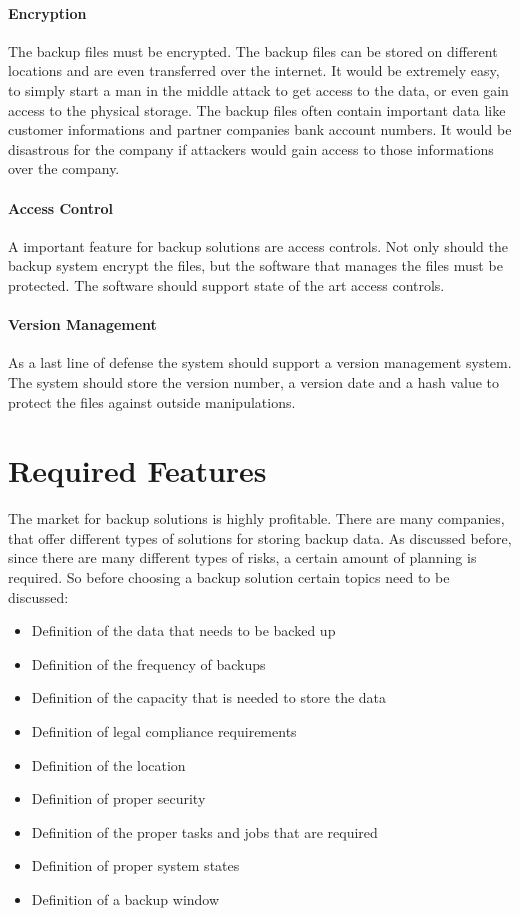 \paragraph{Encryption}

The backup files must be encrypted. The backup files can be stored on
different locations and are even transferred over the internet. It would
be extremely easy, to simply start a man in the middle attack to get
access to the data, or even gain access to the physical storage. The
backup files often contain important data like customer informations and
partner companies bank account numbers. It would be disastrous for the
company if attackers would gain access to those informations over the
company.

\paragraph{Access Control}

A important feature for backup solutions are access controls. Not only
should the backup system encrypt the files, but the software that
manages the files must be protected. The software should support state
of the art access controls.

\paragraph{Version Management}

As a last line of defense the system should support a version management
system. The system should store the version number, a version date and a
hash value to protect the files against outside manipulations. 

\section{Required Features}

The market for backup solutions is highly profitable. There are many
companies, that offer different types of solutions for storing backup
data. As discussed before, since there are many different types of
risks, a certain amount of planning is required. So before choosing a
backup solution certain topics need to be discussed:

\begin{itemize}
\item Definition of the data that needs to be backed up
\item Definition of the frequency of backups 
\item Definition of the capacity that is needed to store the data
\item Definition of legal compliance requirements
\item Definition of the location
\item Definition of proper security
\item Definition of the proper tasks and jobs that are required
\item Definition of proper system states
\item Definition of a backup window   
\end{itemize}

